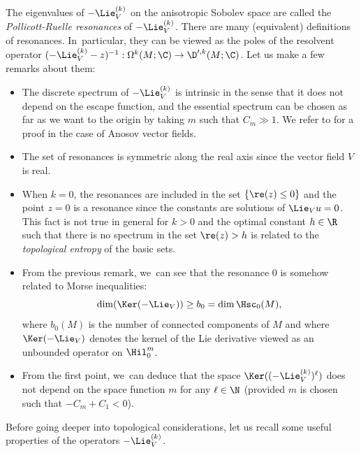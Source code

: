 The eigenvalues of $-\Lie_V^{(k)}$ on the anisotropic Sobolev space are called the \textit{Pollicott-Ruelle resonances} of $-\Lie_V^{(k)}$. There are many (equivalent) definitions of resonances. In~particular, they can be viewed as the poles of the resolvent operator $(-\Lie_V^{(k)} - z)^{-1}: \Omega^k (M; \C) \to \D'^{,k} (M; \C)$. Let us make a few remarks about them:

\skpt
\begin{remark}
\begin{itemize}
\item The discrete spectrum of $-\Lie_V^{(k)}$ is intrinsic in the sense that it does not depend on the escape function, and the essential spectrum can be chosen as far as we want to the origin by taking $m$ such that $C_m \gg 1$. We refer to \cite[Th.\,1.5, p.\,134]{FS} for a proof in the case of Anosov vector fields.
\item The set of resonances is symmetric along the real axis since the vector field $V$ is real.
\item When $k = 0$, the resonances are included in the set $\{ \re (z) \leq 0 \}$ and the point $z = 0$ is a resonance since the constants are solutions of $\Lie_V u = 0$. This fact is not true in general for $k > 0$ and the optimal constant $h \in \R$ such that there is no spectrum in the set $\re (z) > h$ is related to the \textit{topological entropy} of the basic sets.
\item From the previous remark, we~can see that the resonance $0$ is somehow related to Morse inequalities:
\[
\dim (\Ker(-\Lie_V)) \geq b_0 = \dim \Hsc_0 (M),
\]
where $b_0(M)$ is the number of connected components of $M$ and where $\Ker (- \Lie_V)$ denotes the kernel of the Lie derivative viewed as an unbounded operator on $\Hil_0^m$.
\item From the first point, we~can deduce that the space $\Ker ((-\Lie_V^{(k)})^{\ell})$ does not depend on the space function $m$ for any $\ell \in \N$ (provided $m$ is chosen such that $-C_m+C_1<0$).
\end{itemize}
\end{remark}

Before going deeper into topological considerations, let us recall some useful properties of the operators $-\Lie_V^{(k)}$.

